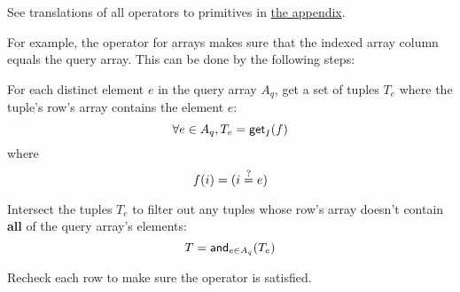 See translations of all operators to primitives in \protect\hyperlink{%
  operators-to-primitives}{%
  the appendix}.

For example, the \sqlinline{=} operator for arrays makes sure that the indexed
array column equals the query array. This can be done by the following steps:

\begin{nparts}
\item
  For each distinct element $e$ in the query array $A_q$, get a set of tuples
  $T_e$ where the tuple's row's array contains the element $e$:
  \[
    \forall e \in A_q, T_e = \mathsf{get}_I(f)
  \]
  where
  \[
    f(i) = \lparen i \overset{?}{=} e\rparen
  \]
\item
  Intersect the tuples $T_e$ to filter out any tuples whose row's array doesn't
  contain \textbf{all} of the query array's elements:
  \[
    T = \mathsf{and}_{e \in A_q}(T_e)
  \]
\item
  Recheck each row to make sure the \sqlinline{=} operator is satisfied.
\end{nparts}
